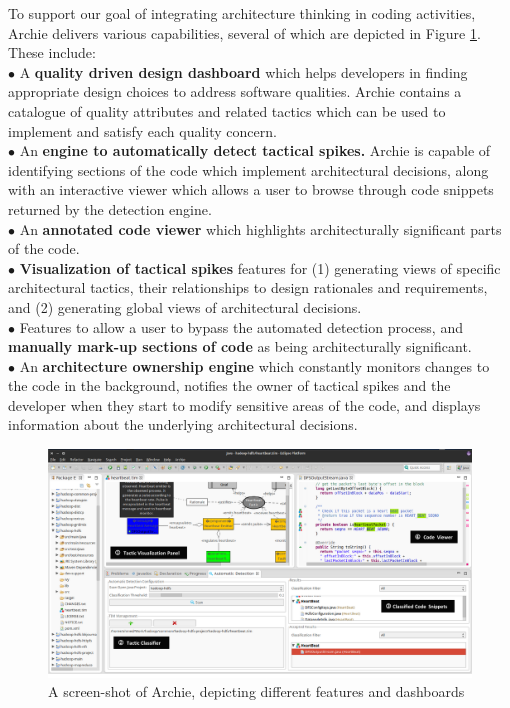 To support our goal of integrating architecture thinking in coding activities, Archie delivers various capabilities, several of which are depicted in Figure \ref{fig:EclipseView}. These include: \\
\noindent$\bullet$ A \textbf{quality driven design dashboard} which helps developers in finding  appropriate design choices to address software qualities. 
Archie contains a catalogue of quality attributes and related tactics which can be used to implement and satisfy each quality concern.\\
\noindent$\bullet$ An \textbf{engine to automatically detect tactical spikes.} Archie is capable of identifying sections of the code which implement architectural decisions, along with an interactive viewer which allows a user to browse through code snippets returned by the detection engine.\\
\noindent$\bullet$ An \textbf{annotated code viewer} which highlights architecturally significant parts of the code. \\
\noindent$\bullet$ \textbf{Visualization of tactical spikes} features for (1) generating views of specific architectural tactics, their relationships to design rationales and requirements, and (2) generating global views of architectural decisions.\\
\noindent$\bullet$ Features to allow a user to bypass the automated detection process, and \textbf{manually mark-up sections of code} as being architecturally significant. \\
 \noindent$\bullet$ An \textbf{architecture ownership engine} which constantly monitors changes to the code in the background, notifies the owner of tactical spikes and the developer when they start to modify sensitive areas of the code, and displays information about the underlying architectural decisions.  

\begin{figure}[tbph]
\centering
\includegraphics[width=0.9\linewidth]{./EclipseView}
\caption{A screen-shot of Archie, depicting different features and dashboards}
\label{fig:EclipseView}
\end{figure}


